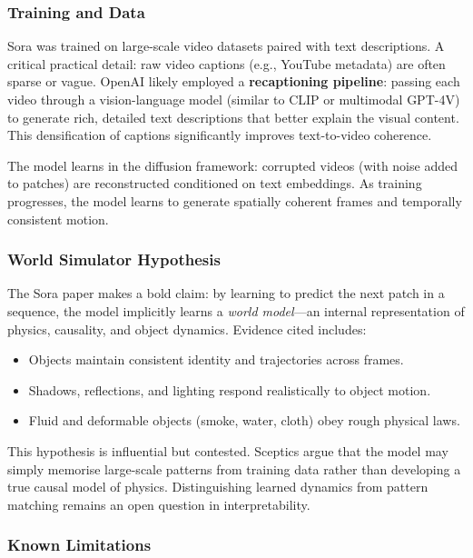 \subsubsection{Training and Data}

Sora was trained on large-scale video datasets paired with text descriptions. A critical practical detail: raw video captions (e.g., YouTube metadata) are often sparse or vague. OpenAI likely employed a \textbf{recaptioning pipeline}: passing each video through a vision-language model (similar to CLIP or multimodal GPT-4V) to generate rich, detailed text descriptions that better explain the visual content. This densification of captions significantly improves text-to-video coherence.

The model learns in the diffusion framework: corrupted videos (with noise added to patches) are reconstructed conditioned on text embeddings. As training progresses, the model learns to generate spatially coherent frames and temporally consistent motion.

\subsubsection{World Simulator Hypothesis}

The Sora paper makes a bold claim: by learning to predict the next patch in a sequence, the model implicitly learns a \emph{world model}—an internal representation of physics, causality, and object dynamics. Evidence cited includes:
\begin{itemize}
  \item Objects maintain consistent identity and trajectories across frames.
  \item Shadows, reflections, and lighting respond realistically to object motion.
  \item Fluid and deformable objects (smoke, water, cloth) obey rough physical laws.
\end{itemize}

This hypothesis is influential but contested. Sceptics argue that the model may simply memorise large-scale patterns from training data rather than developing a true causal model of physics. Distinguishing learned dynamics from pattern matching remains an open question in interpretability.

\subsubsection{Known Limitations}

